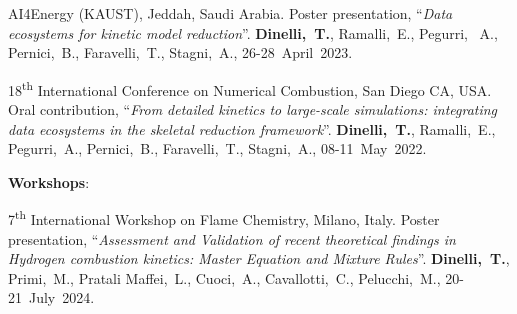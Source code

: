 \begin{etaremune}
   \item
      AI4Energy (KAUST), Jeddah, Saudi Arabia. Poster presentation, ``{\it Data ecosystems for
      kinetic model reduction}''. {\bf Dinelli,~T.}, Ramalli,~E., Pegurri,
      ~A., Pernici,~B., Faravelli,~T., Stagni,~A.,
      26-28~April~2023.

   \item
      18\textsuperscript{th} International Conference on Numerical Combustion, San Diego
      CA, USA. Oral contribution, ``{\it From detailed kinetics to large-scale
      simulations: integrating data ecosystems in the skeletal reduction framework}''.
      {\bf Dinelli,~T.}, Ramalli,~E., Pegurri,~A., Pernici,~B.,
      Faravelli,~T., Stagni,~A.,
      08-11~May~2022.
\end{etaremune}

\textbf{Workshops}:
\begin{etaremune}
   \item
      7\textsuperscript{th} International Workshop on Flame Chemistry, Milano, Italy.
      Poster presentation, ``{\it Assessment and Validation of recent theoretical
      findings in Hydrogen combustion kinetics: Master Equation and Mixture Rules}''.
      {\bf Dinelli,~T.}, Primi,~M., Pratali Maffei,~L., Cuoci,~A.,
      Cavallotti,~C., Pelucchi,~M.,
      20-21~July~2024.
\end{etaremune}

